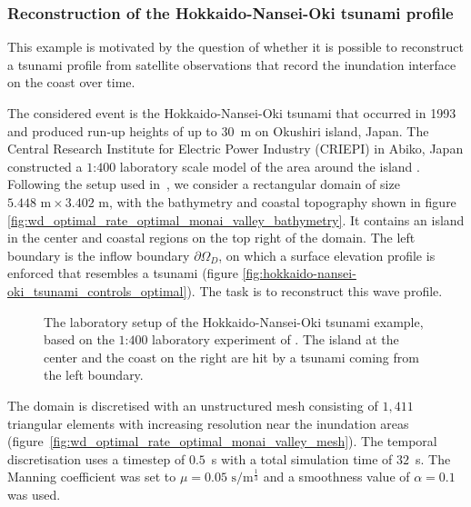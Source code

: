 \documentclass[prodmode,acmtoms]{acmsmall}
\begin{document}
\subsubsection{Reconstruction of the Hokkaido-Nansei-Oki tsunami profile}
This example is motivated by the question of whether it is possible to reconstruct a tsunami profile from satellite observations that record the inundation interface on the coast over time. 

The considered event is the Hokkaido-Nansei-Oki tsunami that occurred in 1993 and produced run-up heights of up to $30$~m on Okushiri island, Japan. 
The Central Research Institute for Electric Power Industry (CRIEPI) in Abiko, Japan constructed a $1$:$400$ laboratory scale model of the area around the island \cite{matsuyama2001}. 
Following the setup used in~, we consider a rectangular domain of size $5.448\textrm{ m} \times 3.402\textrm{ m}$, 
with the bathymetry and coastal topography shown in figure \ref{fig:wd_optimal_rate_optimal_monai_valley_bathymetry}. 
It contains an island in the center and coastal regions on the top right of the domain.
The left boundary is the inflow boundary $\partial \Omega_D$, on which a surface elevation profile is enforced that resembles a tsunami (figure \ref{fig:hokkaido-nansei-oki_tsunami_controls_optimal}). The task is to reconstruct this wave profile. 

\begin{figure}[bt]
\centering
{}
     \caption{The laboratory setup of the Hokkaido-Nansei-Oki tsunami example, based on the $1$:$400$ laboratory experiment of \protect{}. The island at the center and the coast on the right are hit by a tsunami coming from the left boundary.} 
\end{figure}

The domain is discretised with an unstructured mesh consisting of $1,411$ triangular elements with increasing resolution near the inundation areas (figure~\ref{fig:wd_optimal_rate_optimal_monai_valley_mesh}). 
The temporal discretisation uses a timestep of $0.5$~s with a total simulation time of $32$~s. The Manning coefficient was set to $\mu=0.05\textrm{ s}/\textrm{m}^{\frac{1}{3}}$
and a smoothness value of $\alpha = 0.1$ was used.
\end{document}
